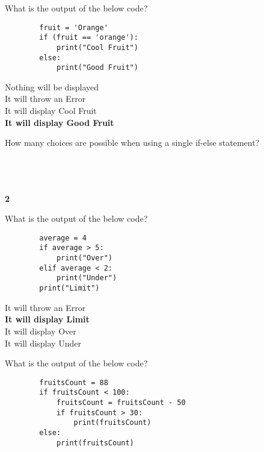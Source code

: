 \documentclass{exam}
\begin{document}
\begin{questions}
    \question What is the output of the below code?

    \begin{verbatim}
        fruit = 'Orange'
        if (fruit == 'orange'):
            print("Cool Fruit")
        else:
            print("Good Fruit")
    \end{verbatim}

    \begin{oneparchoices}
        \choice Nothing will be displayed \\
        \choice It will throw an Error \\
        \choice It will display Cool Fruit \\
        \choice \textbf{It will display Good Fruit}
    \end{oneparchoices}

    \question How many choices are possible when using a single if-else statement?

    \begin{oneparchoices}
         \\
         \\
         \\
        \choice \textbf{2}
    \end{oneparchoices}

    \question What is the output of the below code?
    
    \begin{verbatim}
        average = 4
        if average > 5:
            print("Over")
        elif average < 2:
            print("Under")
        print("Limit")
    \end{verbatim}

    \begin{oneparchoices}
        \choice It will throw an Error \\
        \choice \textbf{It will display Limit} \\
        \choice It will display Over \\
        \choice It will display Under
    \end{oneparchoices}

    \question What is the output of the below code?

    \begin{verbatim}
        fruitsCount = 88
        if fruitsCount < 100:
            fruitsCount = fruitsCount - 50
            if fruitsCount > 30:
                print(fruitsCount)
        else:
            print(fruitsCount)
    \end{verbatim}


\end{questions}
\end{document}
